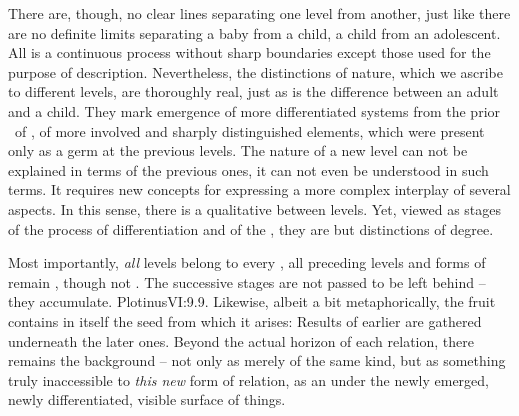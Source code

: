 There are, though, no clear lines separating one level from another, just like
there are no definite limits separating a baby from a child, a child from an
adolescent.  All is a continuous process without sharp boundaries except
those used for the purpose of description.  Nevertheless, the distinctions
of nature, which we ascribe to different levels, are thoroughly real, just as is
the difference between an adult and a child.  They mark emergence of more
differentiated systems from the prior \nexuss\ of , of more involved
and sharply distinguished elements, which were present only as a 
germ at the previous levels.  The nature of a new level can not be explained in
terms of the previous ones, it can not even be understood in such terms.  It
requires new concepts for expressing a more complex interplay of several
aspects.  In this sense, there is a qualitative  between levels.
Yet, viewed as stages of the process of differentiation and 
of the  , they are but distinctions of degree.

\label{pa:preserves}%
\pa Most importantly, {\em all} levels belong to every
, all preceding levels and forms of  remain
, though not .  The successive stages are not passed to be
left behind -- they accumulate. \citet{We have not been cut away; we are not
  separate; [...] we breath and hold our ground because the Supreme does not
  give and pass but gives on for ever, so long as it remains what it
  is.}{Plotinus}{VI:9.9. Likewise, albeit a bit metaphorically, the fruit
  contains in itself the seed from which it arises: } Results of earlier 
are gathered underneath the later ones.  Beyond the actual horizon of each
relation, there remains the background -- not only as merely 
of the same kind, but as something truly inaccessible to {\em this new} form of
relation, as an  under the newly
emerged, newly differentiated, visible surface of things.

